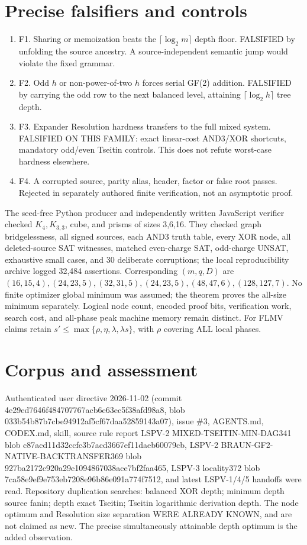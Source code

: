 \documentclass[11pt]{article}
\begin{document}
\section*{Precise falsifiers and controls}
\begin{enumerate}
\item[] F1. Sharing or memoization beats the \(\lceil\log_2 m\rceil\) depth floor. FALSIFIED by unfolding the source ancestry. A source-independent semantic jump would violate the fixed grammar.
\item[] F2. Odd \(h\) or non-power-of-two \(h\) forces serial GF(2) addition. FALSIFIED by carrying the odd row to the next balanced level, attaining \(\lceil\log_2 h\rceil\) tree depth.
\item[] F3. Expander Resolution hardness transfers to the full mixed system. FALSIFIED ON THIS FAMILY: exact linear-cost AND3/XOR shortcuts, mandatory odd/even Tseitin controls. This does not refute worst-case hardness elsewhere.
\item[] F4. A corrupted source, parity alias, header, factor or false root passes. Rejected in separately authored finite verification, not an asymptotic proof.
\end{enumerate}
The seed-free Python producer and independently written JavaScript verifier checked \(K_4,K_{3,3}\), cube, and prisms of sizes 3,6,16. They checked graph bridgelessness, all signed sources, each AND3 truth table, every XOR node, all deleted-source SAT witnesses, matched even-charge SAT, odd-charge UNSAT, exhaustive small cases, and 30 deliberate corruptions; the local reproducibility archive logged 32,484 assertions. Corresponding \((m,q,D)\) are \((16,15,4),(24,23,5),(32,31,5),(24,23,5),(48,47,6),(128,127,7)\). No finite optimizer global minimum was assumed; the theorem proves the all-size minimum separately. Logical node count, encoded proof bits, verification work, search cost, and all-phase peak machine memory remain distinct. For FLMV claims retain \(s'\le\max\{\rho,\eta,\lambda,\lambda s\}\), with \(\rho\) covering ALL local phases.

\section*{Corpus and assessment}
Authenticated user directive 2026-11-02 (commit 4e29ed7646f484707767acb6e63ec5f38afd98a8, blob 033b54b87b7cbe94912af5cf67daa52859143a07), issue \#3, AGENTS.md, CODEX.md, skill, source rule report LSPV-2 MIXED-TSEITIN-MIN-DAG341 blob c87acd11d32ccfc3b7acd3667ef11daeb60079cb, LSPV-2 BRAUN-GF2-NATIVE-BACKTRANSFER369 blob 927ba2172c920a29e1094867038ace7bf2faa465, LSPV-3 locality372 blob 7ca58e9ef9e753eb7208e96b86e091a774f7512, and latest LSPV-1/4/5 handoffs were read. Repository duplication searches: balanced XOR depth; minimum depth source fanin; depth exact Tseitin; Tseitin logarithmic derivation depth. The node optimum and Resolution size separation WERE ALREADY KNOWN, and are not claimed as new. The precise simultaneously attainable depth optimum is the added observation.
\end{document}
